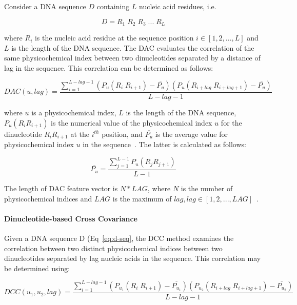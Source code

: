 Consider a \gls{DNA} sequence $D$ containing $L$ nucleic acid residues, i.e.

\begin{equation}\label{eq:d-seq}
    D = R_{1}\;R_{2}\;R_{3}\;...\;R_{L}
\end{equation}

where $R_{i}$ is the nucleic acid residue at the sequence position $i \in [1,2,...,L]$ and $L$ is the length of the \gls{DNA} sequence. The \gls{DAC} evaluates the correlation of the same physicochemical index between two dinucleotides separated by a distance of lag in the sequence. This correlation can be determined as follows:

\begin{equation}\label{eq:DAC}
    DAC(u,lag) = \frac{\sum_{i=1}^{L-lag-1}(P_{u}(R_{i}\;R_{i+1}) - \overline{P_{u}})(P_{u}(R_{i+lag}\;R_{i+lag+1}) - \overline{P_{u}})}{L-lag-1}
\end{equation}

where $u$ is a physicochemical index, $L$ is the length of the \gls{DNA} sequence, $P_{u}(R_{i}R_{i+1})$ is the numerical value of the physicochemical index $u$ for the dinucleotide $R_{i}R_{i+1}$ at the $i^{th}$ position, and $\overline{P_{u}}$ is the average value for physicochemical index $u$ in the sequence~\cite{Zhu2016RDNAse:CHINA}. The latter is calculated as follows:

\begin{equation}\label{eq:DAC-PU}
    \overline{P_{u}} = \frac{\sum_{j=1}^{L-1}P_{u}(R_{j}R_{j+1})}{L-1}
\end{equation}

The length of \gls{DAC} feature vector is $N*LAG$, where $N$ is the number of physicochemical indices and $LAG$ is the maximum of $lag, lag \in [1,2,...,LAG]$~\cite{Zhu2016RDNAse:CHINA}.

\paragraph{Dinucleotide-based Cross Covariance}
Given a \gls{DNA} sequence D (Eq~\ref{eq:d-seq}, the \gls{DCC} method examines the correlation between two distinct physicochemical indices between two dinucleotides separated by lag nucleic acids in the sequence. This correlation may be determined using:

\begin{equation}\label{eq:DCC}
    DCC(u_{1},u_{2},lag) = \frac{\sum_{i=1}^{L-lag-1}(P_{u_{1}}(R_{i}\;R_{i+1}) - \overline{P_{u_{1}}})(P_{u_{2}}(R_{i+lag}\;R_{i+lag+1}) - \overline{P_{u_{2}}})}{L-lag-1}
\end{equation}

